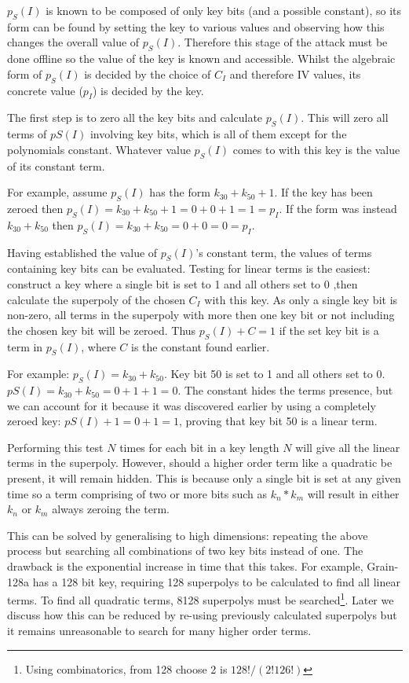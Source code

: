 \documentclass{report}
\begin{document}
$p_S(I)$ is known to be composed of only key bits (and a possible constant), so its form can be found by setting the key to various values and observing how this changes the overall value of $p_S(I)$. Therefore this stage of the attack must be done offline so the value of the key is known and accessible. Whilst the algebraic form of $p_S(I)$ is decided by the choice of $C_I$ and therefore IV values, its concrete value ($p_I$) is decided by the key.

The first step is to zero all the key bits and calculate $p_S(I)$. This will zero all terms of $pS(I)$ involving key bits, which is all of them except for the polynomials constant. Whatever value $p_S(I)$ comes to with this key is the value of its constant term.

For example, assume $p_S(I)$ has the form $k_{30}+k_{50}+1$. If the key has been zeroed then $p_S(I)=k_{30}+k_{50}+1=0+0+1=1=p_I$. If the form was instead $k_{30}+k_{50}$ then $p_S(I)=k_{30}+k_{50}=0+0=0=p_I$.

Having established the value of $p_S(I)$'s constant term, the values of terms containing key bits can be evaluated. Testing for linear terms is the easiest: construct a key where a single bit is set to 1 and all others set to 0 ,then calculate the superpoly of the chosen $C_I$ with this key. As only a single key bit is non-zero, all terms in the superpoly with more then one key bit or not including the chosen key bit will be zeroed. Thus $p_S(I)+C=1$ if the set key bit is a term in $p_S(I)$, where $C$ is the constant found earlier.

For example: $p_S(I)=k_{30}+k_{50}$. Key bit 50 is set to 1 and all others set to 0. $pS(I)=k_{30}+k_{50}=0+1+1=0$. The constant hides the terms presence, but we can account for it because it was discovered earlier by using a completely zeroed key: $pS(I)+1=0+1=1$, proving that key bit 50 is a linear term.

Performing this test $N$ times for each bit in a key length $N$ will give all the linear terms in the superpoly. However, should a higher order term like a quadratic be present, it will remain hidden. This is because only a single bit is set at any given time so a term comprising of two or more bits such as $k_n*k_m$ will result in either $k_n$ or $k_m$ always zeroing the term.

This can be solved by generalising to high dimensions: repeating the above process but searching all combinations of two key bits instead of one. The drawback is the exponential increase in time that this takes. For example, Grain-128a has a 128 bit key, requiring 128 superpolys to be calculated to find all linear terms. To find all quadratic terms, 8128 superpolys must be searched\footnote{Using combinatorics, from 128 choose 2 is $128!/(2!126!)$}. Later we discuss how this can be reduced by re-using previously calculated superpolys but it remains unreasonable to search for many higher order terms.
\end{document}
